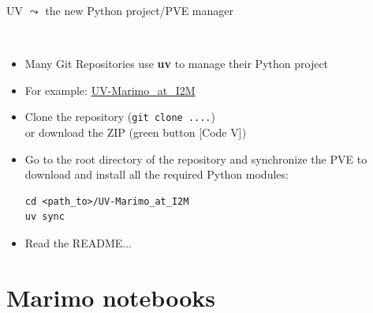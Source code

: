 \documentclass[11pt, serif, mathserif, compress]{beamer}  %
\begin{document}
\begin{frame}[fragile]{UV $\leadsto$ the new Python project/PVE manager}
  
  \begin{bclogo}[noborder=true, couleur=gray!20, couleurBarre=Chocolate, logo=\raisebox{1mm}{\,\huge⚙}, marge=0, margeG=-0.6, margeD=-0.6,]
    {\ }
    \smallskip

    \begin{minipage}[t][][t]{1.\textwidth}
      \begin{itemize}\setlength\itemsep{3mm}
      \item<2-> Many Git Repositories use {\bf uv} to manage their Python project

      \item<3-> For example: \href{https://github.com/cjlux/UV-Marimo_at_I2M}{UV-Marimo\_at\_I2M}
        
      \item<4-> Clone the repository (\texttt{git clone ....})\\
        or download the ZIP (green button [Code V])
        
      \item<5-> Go to the root directory of the repository and synchronize the PVE to download and install all the required Python modules:
        \begin{verbatim}
cd <path_to>/UV-Marimo_at_I2M
uv sync
        \end{verbatim}
      \item Read the README...
      \end{itemize}
    \end{minipage}\begin{minipage}[t][][b]{.1\textwidth}
    \end{minipage}
  \end{bclogo}
  \vfill
\end{frame}

\section{Marimo notebooks}
\end{document}
